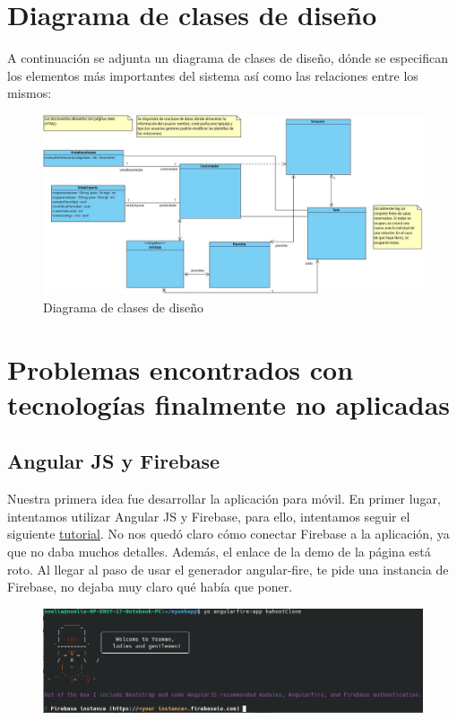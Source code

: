 \documentclass{article}
\begin{document}
	\section{Diagrama de clases de diseño}
	A continuación se adjunta un diagrama de clases de diseño, dónde se especifican los elementos más importantes del sistema así como las relaciones entre los mismos:
	
	\begin{figure}[H]
		\centering
		\includegraphics[totalheight=7cm]{img/5.jpg}
		\caption{Diagrama de clases de diseño}
		\label{fig:figura1}
	\end{figure}
	
	\section{Problemas encontrados con tecnologías finalmente no aplicadas}
	\subsection{Angular JS y Firebase}
	Nuestra primera idea fue desarrollar la aplicación para móvil. En primer lugar, intentamos utilizar Angular JS y Firebase, para ello, intentamos seguir el siguiente 
	 \href{https://medium.com/@rotemtam/build-a-kahoot-clone-with-angularjs-and-firebase-b8b30891d968}{tutorial}. No nos quedó claro cómo conectar Firebase a la aplicación, ya que no daba muchos detalles. Además, el enlace de la demo de la página está roto. Al llegar al paso de usar el generador angular-fire, te pide una instancia de Firebase, no dejaba muy claro qué había que poner.
	 
	 \begin{figure}[H]
	 	\centering
	 	\includegraphics[totalheight=3.35cm]{img/1.png}
	 \end{figure}
 
\end{document}
